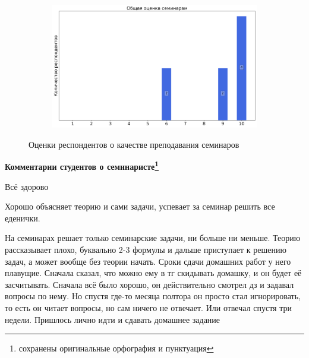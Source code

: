 \begin{figure}[H]
\begin{subfigure}[b]{0.45\textwidth}
			\end{subfigure}
			\begin{subfigure}[b]{0.45\textwidth}
				\centering
				\includegraphics[width=\textwidth]{images/1 course/Общая физика - механика/seminarists-marks-Лилиенберг И.В.-3.png}
			\end{subfigure}	
			\caption{Оценки респондентов о качестве преподавания семинаров}
		\end{figure}

		\textbf{Комментарии студентов о семинаристе\protect\footnote{сохранены оригинальные орфография и пунктуация}}
            \begin{commentbox} 
                Всё здорово 
            \end{commentbox} 
        
            \begin{commentbox} 
                Хорошо объясняет теорию и сами задачи, успевает за семинар решить все еденички.  
            \end{commentbox} 
        
            \begin{commentbox} 
                На семинарах решает только семинарские задачи, ни больше ни меньше. Теорию рассказывает  плохо, буквально 2-3 формулы и дальше приступает к решению задач, а может вообще без теории начать. Сроки сдачи домашних работ у него плавущие. Сначала сказал, что можно ему в тг скидывать домашку, и он будет её засчитывать. Сначала всё было хорошо, он действительно смотрел дз и задавал вопросы по нему. Но спустя где-то месяца полтора он просто стал игнорировать, то есть он читает вопросы, но сам ничего не отвечает. Или отвечал спустя три недели. Пришлось лично идти и сдавать домашнее задание 
            \end{commentbox} 
					
